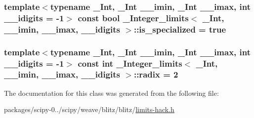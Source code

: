 \subsubsection[{is\+\_\+specialized}]{\setlength{\rightskip}{0pt plus 5cm}template$<$typename \+\_\+\+Int, \+\_\+\+Int \+\_\+\+\_\+imin, \+\_\+\+Int \+\_\+\+\_\+imax, int \+\_\+\+\_\+idigits = -\/1$>$ const {\bf bool} {\bf \+\_\+\+Integer\+\_\+limits}$<$ \+\_\+\+Int, \+\_\+\+\_\+imin, \+\_\+\+\_\+imax, \+\_\+\+\_\+idigits $>$\+::is\+\_\+specialized = {\bf true}\hspace{0.3cm}{\ttfamily [static]}}\label{class__Integer__limits_a732d0d9a24623f683ec4376516224b69}
\hypertarget{class__Integer__limits_a414672a54e911e7cccb52d8d1085d01a}{}
\subsubsection[{radix}]{\setlength{\rightskip}{0pt plus 5cm}template$<$typename \+\_\+\+Int, \+\_\+\+Int \+\_\+\+\_\+imin, \+\_\+\+Int \+\_\+\+\_\+imax, int \+\_\+\+\_\+idigits = -\/1$>$ const int {\bf \+\_\+\+Integer\+\_\+limits}$<$ \+\_\+\+Int, \+\_\+\+\_\+imin, \+\_\+\+\_\+imax, \+\_\+\+\_\+idigits $>$\+::radix = 2\hspace{0.3cm}{\ttfamily [static]}}\label{class__Integer__limits_a414672a54e911e7cccb52d8d1085d01a}


The documentation for this class was generated from the following file\+:\begin{DoxyCompactItemize}
\item 
packages/scipy-\/0../scipy/weave/blitz/blitz/\hyperlink{limits-hack_8h}{limits-\/hack.\+h}\end{DoxyCompactItemize}
